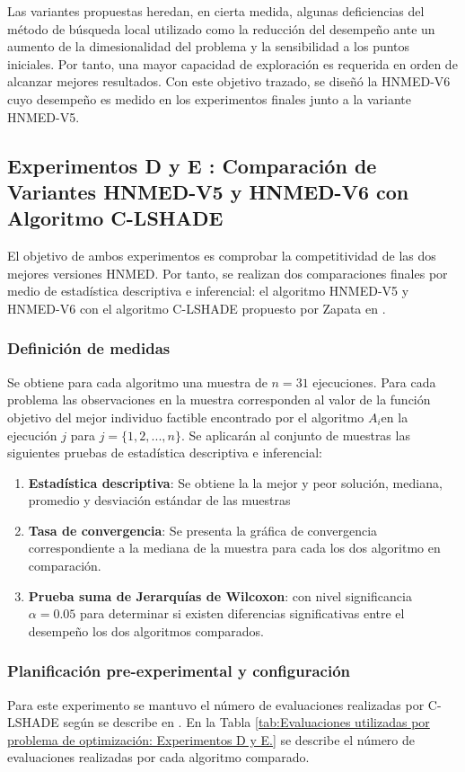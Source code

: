 Las variantes propuestas heredan, en cierta medida, algunas deficiencias del método de búsqueda local utilizado como la reducción del desempeño ante un aumento de la dimesionalidad del problema y la sensibilidad a los puntos iniciales. Por tanto, una mayor capacidad de exploración es requerida en orden de alcanzar mejores resultados. Con este objetivo trazado, se diseñó la HNMED-V6 cuyo desempeño es medido en los experimentos finales junto a la variante HNMED-V5.


\subsection{Experimentos D y E : Comparación de Variantes HNMED-V5 y HNMED-V6 con Algoritmo C-LSHADE}
El objetivo de ambos experimentos es comprobar la competitividad  de las dos mejores versiones HNMED. Por tanto, se realizan dos comparaciones finales por medio de estadística descriptiva e inferencial: el algoritmo HNMED-V5 y HNMED-V6 con el algoritmo C-LSHADE propuesto por Zapata en \cite{zapata_zapata_control_2017}.
\subsubsection{Definición de medidas}
Se obtiene para cada algoritmo una muestra de $n=31$ ejecuciones. Para cada problema las observaciones en la muestra corresponden al valor de la función objetivo del mejor individuo factible encontrado por el algoritmo $A_i$en la ejecución $j$ para $j= \{ 1,2,...,n\}$. Se aplicarán al conjunto de muestras las siguientes pruebas de estadística descriptiva e inferencial:
\begin{enumerate}
	\item \textbf{Estadística descriptiva}: Se obtiene la la mejor y peor solución, mediana, promedio y desviación estándar de las muestras
	\item \textbf{Tasa de convergencia}: Se presenta la gráfica de convergencia correspondiente a la mediana de la muestra para cada los dos algoritmo en comparación.
	\item \textbf{Prueba suma de Jerarquías de Wilcoxon}: con nivel significancia $\alpha=0.05$ para determinar si existen diferencias significativas entre el desempeño los dos algoritmos comparados. 
	
\end{enumerate}
\subsubsection{Planificación pre-experimental y configuración}
Para este experimento se mantuvo el número de evaluaciones realizadas por C-LSHADE según se describe en \cite{zapata_zapata_control_2017}. En la Tabla \ref{tab:Evaluaciones utilizadas por problema de optimización: Experimentos D y E.} se describe el número de evaluaciones realizadas por cada algoritmo comparado.

